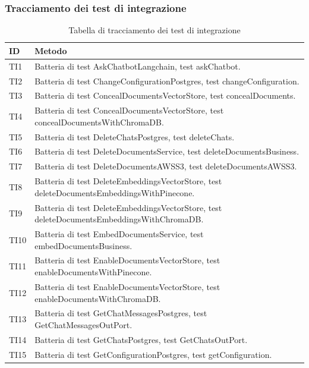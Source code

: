 \documentclass[10pt, a4paper]{article}
\begin{document}
    \subsubsection{Tracciamento dei test di integrazione} 
    \renewcommand{\arraystretch}{1.5}
    \begin{xltabular}{\textwidth}{p{0.12\textwidth}|X}
    \caption{Tabella di tracciamento dei test di integrazione}
    \label{tab:test_tracciamento_test_integrazione}\\
    \textbf{ID} & \textbf{Metodo} \\
    \hline
    TI1 & Batteria di test AskChatbotLangchain, test askChatbot. \\
    \hline
    TI2 & Batteria di test ChangeConfigurationPostgres, test changeConfiguration. \\
    \hline
    TI3 & Batteria di test ConcealDocumentsVectorStore, test concealDocuments. \\
    \hline
    TI4 & Batteria di test ConcealDocumentsVectorStore, test concealDocumentsWithChromaDB. \\
    \hline
    TI5 & Batteria di test DeleteChatsPostgres, test deleteChats. \\
    \hline
    TI6 & Batteria di test DeleteDocumentsService, test deleteDocumentsBusiness. \\
    \hline
    TI7 & Batteria di test DeleteDocumentsAWSS3, test deleteDocumentsAWSS3. \\
    \hline
    TI8 & Batteria di test DeleteEmbeddingsVectorStore, test deleteDocumentsEmbeddingsWithPinecone. \\
    \hline
    TI9 & Batteria di test DeleteEmbeddingsVectorStore, test deleteDocumentsEmbeddingsWithChromaDB. \\
    \hline
    TI10 & Batteria di test EmbedDocumentsService, test embedDocumentsBusiness. \\
    \hline
    TI11 & Batteria di test EnableDocumentsVectorStore, test enableDocumentsWithPinecone. \\
    \hline
    TI12 & Batteria di test EnableDocumentsVectorStore, test enableDocumentsWithChromaDB. \\
    \hline
    TI13 & Batteria di test GetChatMessagesPostgres, test GetChatMessagesOutPort. \\
    \hline
    TI14 & Batteria di test GetChatsPostgres, test GetChatsOutPort. \\
    \hline
    TI15 & Batteria di test GetConfigurationPostgres, test getConfiguration. \\

\end{xltabular}
\end{document}
